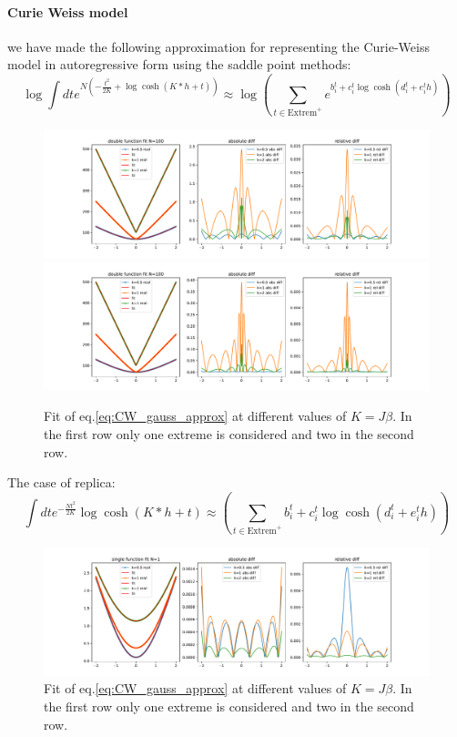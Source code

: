 \documentclass{article}
\begin{document}
\paragraph{Curie Weiss model}
we have made the following approximation for representing the Curie-Weiss model in autoregressive form using the saddle point methods:
\[
\log \int dt e^{N(-\frac{t^2}{2K}+\log\cosh(K*h+t))} \approx \log\left(\sum_{t \in \text{Extrem}^+}  e^{b_i^t + c_i^t\log\cosh(d_i^t+e_i^t h)}\right)
\label{eq:CW_gauss_approx}
\]
\begin{figure}[h]
    \centering
    \includegraphics[width=1\textwidth]{img/CW_fit_N100.pdf}
    \includegraphics[width=1\textwidth]{img/CW_fit2_N100.pdf}
    \caption{Fit of eq.\ref{eq:CW_gauss_approx} at different values of $K=J\beta$. In the first row only one extreme is considered and two in the second row.}
    \label{fig:mesh1}
\end{figure}
The case of replica:
\[
 \int dt e^{-\frac{Nt^2}{2K}}\log\cosh(K*h+t) \approx \left(\sum_{t \in \text{Extrem}^+}  b_i^t + c_i^t\log\cosh(d_i^t+e_i^t h)\right)
\label{eq:CW_gauss_approx2}
\]

\begin{figure}[h]
    \centering
    \includegraphics[width=1\textwidth]{img/RFIM_fit.pdf}
    \caption{Fit of eq.\ref{eq:CW_gauss_approx} at different values of $K=J\beta$. In the first row only one extreme is considered and two in the second row.}
    \label{fig:gauss_approx}
\end{figure}
\end{document}
